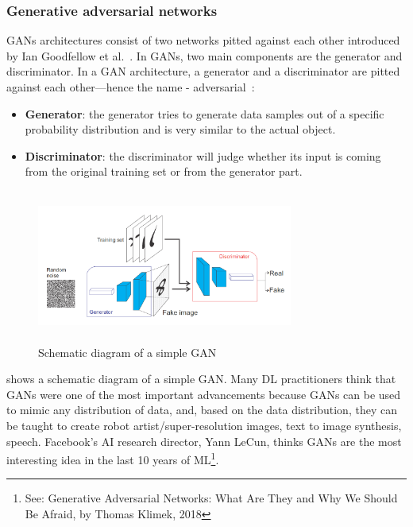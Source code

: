 \subsubsection{Generative adversarial networks}
GANs architectures consist of two networks pitted against each other introduced by Ian Goodfellow et al.~\cite{GAN}. In GANs, two main components are the generator and discriminator. In a GAN architecture, a generator and a discriminator are pitted against each other—hence the name - adversarial~\cite{GAN}:

\vspace{-2mm}
\begin{itemize}[noitemsep]
    \item \textbf{Generator}: the generator tries to generate data samples out of a specific probability distribution and is very similar to the actual object.
    \item \textbf{Discriminator}: the discriminator will judge whether its input is coming from the original training set or from the generator part. 
\end{itemize}

\vspace{-2mm}
\begin{figure}[h]
    \centering
    \vspace{-3mm}
    \includegraphics[width=0.75\textwidth,height=50mm]{images/gan.png}
    \caption{Schematic diagram of a simple GAN~\cite{karimDLTF2018}}
    \label{fig:gan}
    \vspace{-2mm}
\end{figure}

\hspace*{3.5mm}  shows a schematic diagram of a simple GAN. Many DL practitioners think that GANs were one of the most important advancements because GANs can be used to mimic any distribution of data, and, based on the data distribution, they can be taught to create robot artist/super-resolution images, text to image synthesis, speech. Facebook's AI research director, Yann LeCun, thinks GANs are the most interesting idea in the last 10 years of ML\footnote{See: Generative Adversarial Networks: What Are They and Why We Should Be Afraid, by Thomas Klimek, 2018}.


